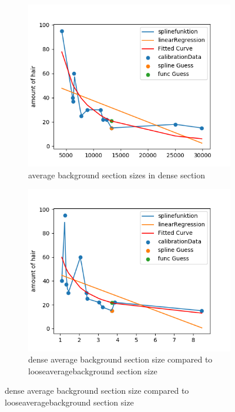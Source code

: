\documentclass[german,a4paper, 12pt]{llncs}
\begin{document}
\begin{figure}[H]
	\medskip
	\begin{subfigure}{0.48\textwidth}
		\includegraphics[width=1.15\linewidth]{fig64/g09_avgbackgroundsectionsizes.png}
		\caption{average background section sizes in dense section} \label{fig:c}
	\end{subfigure}\hspace*{\fill}
	\begin{subfigure}{0.48\textwidth}
		\includegraphics[width=1.15\linewidth]{fig64/g10_denseavgbackgroundsizeVSlooseavg.png}
		\caption{dense average background section size compared to looseaveragebackground section size} \label{fig:d}
	\end{subfigure}
	

\end{figure}
\end{document}
